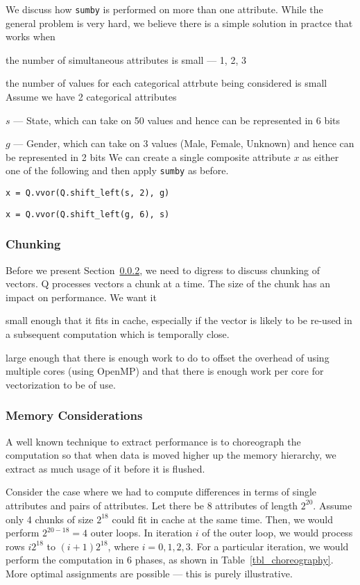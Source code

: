 We discuss how {\tt sumby} is performed on more than one attribute. While the
general problem is very hard, we believe there is a simple solution in practce
that works when
\be
\item the number of simultaneous attributes is small --- 1, 2, 3
\item the number of values for each categorical attrbute being considered is
small
\ee
Assume we have 2 categorical attributes
\be
\item \(s\) --- State, which can take on 50 values and hence can be represented in 6 bits
\item \(g\) --- Gender, which can take on 3 values (Male, Female, Unknown) and hence can
be represented in 2 bits
\ee
We can create a single composite attribute \(x\) as either one of the following
and then apply {\tt sumby} as before. 
\be
\item \verb+x = Q.vvor(Q.shift_left(s, 2), g)+
\item \verb+x = Q.vvor(Q.shift_left(g, 6), s)+
\ee

\subsubsection{Chunking}
\label{Chunking}

Before we present Section~\ref{MemoryConsiderations}, we need to digress to
discuss chunking of vectors. Q processes vectors a chunk at a time. The size of
the chunk has an impact on performance. We want it 
\bi
\item small enough that it fits in cache, especially if the vector is likely to
be re-used in a subsequent computation which is temporally close.
\item large enough that there is enough work to do to offset the overhead of
using multiple cores (using OpenMP) and that there is enough work per core for
vectorization to be of use.
\ei

\subsubsection{Memory Considerations}
\label{MemoryConsiderations}

A well known technique to extract performance is to choreograph the computation
so that when data is moved higher up the memory hierarchy, we extract as much
usage of it before it is flushed.

Consider the case where we had to compute differences in terms of single
attributes and pairs of attributes. 
Let there be  8 attributes of length \(2^{20}\).
Assume only 4 chunks of size \(2^{18}\)
could fit in cache at the same time. 
Then, we would perform \(2^{20-18} = 4\) outer loops. 
In iteration \(i\) of the outer loop, we would process rows \(i 2^{18}\) to
\((i+1)2^{18}\), where \(i = 0, 1, 2, 3\). For a particular iteration,
we would perform the computation in 6 phases, as shown in
Table~\ref{tbl_choreography}. More optimal assignments are possible --- this is
purely illustrative.


